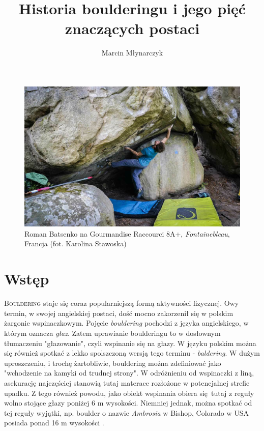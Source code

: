 \documentclass{article}
\title{Historia boulderingu i jego pięć znaczących postaci}
\author{Marcin Młynarczyk}
\date{\displaydate{date}}
\begin{document}
\maketitle
\tableofcontents

\bigskip

\begin{figure}[!htbp]
	\begin{center}
		\includegraphics[width=0.7\linewidth]{images/intro.eps}
	\end{center}
	\caption{Roman Batsenko na Gourmandise Raccourci 8A+, \textit{Fontainebleau}, Francja (fot. Karolina Stawoska) \cite{8a}}
\end{figure}

\section{Wstęp}
\lettrine[lines=2]{B}{ouldering} staje się coraz popularniejszą formą aktywności fizycznej. Owy termin, w swojej angielskiej postaci, dość mocno zakorzenił się w polskim żargonie wspinaczkowym. Pojęcie \textit{bouldering} pochodzi z języka angielskiego, w którym oznacza \textit{głaz}. Zatem uprawianie boulderingu to w dosłownym tłumaczeniu "głazowanie", czyli wspinanie się na głazy. W języku polskim można się również spotkać z lekko spolszczoną wersją tego terminu - \textit{baldering}. W dużym uproszczeniu, i trochę żartobliwie, bouldering można zdefiniować jako "wchodzenie na kamyki od trudnej strony". W odróżnieniu od wspinaczki z liną, asekurację najczęściej stanowią tutaj materace rozłożone w potencjalnej strefie upadku. Z tego również powodu, jako obiekt wspinania obiera się tutaj z reguły wolno stojące głazy poniżej 6 m wysokości. Niemniej jednak, można spotkać od tej reguły wyjątki, np. boulder o nazwie \textit{Ambrosia} w Bishop, Colorado w USA posiada ponad 16 m wysokości \cite{ambrosia}.
\end{document}
